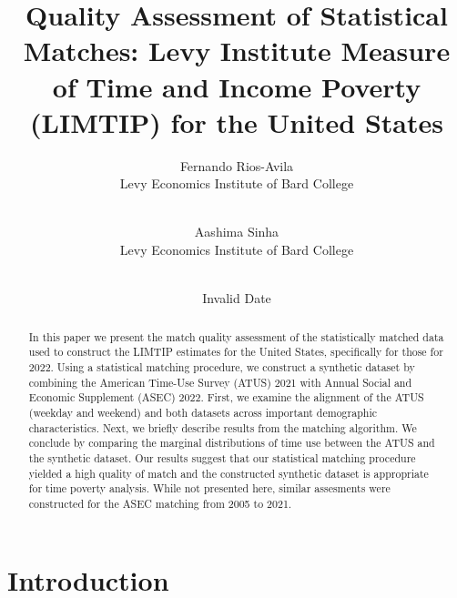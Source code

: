 \documentclass[
  11pt,
]{article}
\title{Quality Assessment of Statistical Matches: Levy Institute Measure
of Time and Income Poverty (LIMTIP) for the United States}
\author{
Fernando Rios-Avila\\
Levy Economics Institute of Bard College\\
\\
\and 
Aashima Sinha\\
Levy Economics Institute of Bard College\\
\\
}
\date{Invalid Date}
\begin{document}
\def\spacingset#1{\renewcommand{\baselinestretch}%
{#1}\small\normalsize} \spacingset{1}


\maketitle
\begin{abstract}
In this paper we present the match quality assessment of the
statistically matched data used to construct the LIMTIP estimates for
the United States, specifically for those for 2022. Using a statistical
matching procedure, we construct a synthetic dataset by combining the
American Time-Use Survey (ATUS) 2021 with Annual Social and Economic
Supplement (ASEC) 2022. First, we examine the alignment of the ATUS
(weekday and weekend) and both datasets across important demographic
characteristics. Next, we briefly describe results from the matching
algorithm. We conclude by comparing the marginal distributions of time
use between the ATUS and the synthetic dataset. Our results suggest that
our statistical matching procedure yielded a high quality of match and
the constructed synthetic dataset is appropriate for time poverty
analysis. While not presented here, similar assesments were constructed
for the ASEC matching from 2005 to 2021.
\end{abstract}
 
\vspace{.2in}



\thispagestyle{empty}
\clearpage{}
\newpage
\spacingset{1.2} %
\section{Introduction}\label{introduction}
\end{document}
